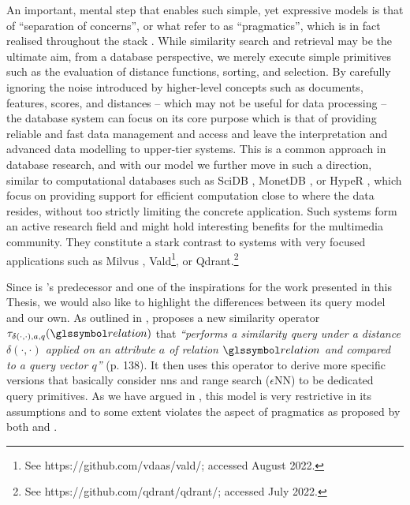 An important, mental step that enables such simple, yet expressive models is that of ``separation of concerns'', or what \cite{Giangreco:2018Database,Ferro:2014Bridging} refer to as ``pragmatics'', which is in fact realised throughout the \vitrivr{} stack \cite{Rossetto:2016Vitrivr,Gasser:2019Multimodal}. While similarity search and retrieval may be the ultimate aim, from a database perspective, we merely execute simple primitives such as the evaluation of distance functions, sorting, and selection. By carefully ignoring the noise introduced by higher-level concepts such as documents, features, scores, and distances -- which may not be useful for data processing -- the database system can focus on its core purpose which is that of providing reliable and fast data management and access and leave the interpretation and advanced data modelling to upper-tier systems. This is a common approach in database research, and with our model we further move in such a direction, similar to computational databases such as SciDB \cite{Stonebraker:2013SciDB}, MonetDB \cite{Idreos:2012MonetDB}, or HypeR \cite{Hubig:2017HyPerInsight}, which focus on providing support for efficient computation close to where the data resides, without too strictly limiting the concrete application. Such systems form an active research field \cite{Luo:2018Scalable,Blacher:2022Machine} and might hold interesting benefits for the multimedia community. They constitute a stark contrast to systems with very focused applications such as Milvus \cite{Wang:2021Milvus}, Vald\footnote{See https://github.com/vdaas/vald/; accessed August 2022.}, or Qdrant.\footnote{See https://github.com/qdrant/qdrant/; accessed July 2022.}

Since \adampro \cite{Giangreco:2016Adam} is \cottontail{}'s predecessor and one of the inspirations for the work presented in this Thesis, we would also like to highlight the differences between its query model and our own. As outlined in , \cite{Giangreco:2018Database} proposes a new similarity operator $\tau_{\delta(\cdot,\cdot),a,q}(\relation)$ that \emph{``performs a similarity query under a distance $\delta(\cdot,\cdot)$ applied on an attribute $a$ of relation $\relation$ and compared to a query vector $q$''} \cite{Giangreco:2018Database} (p. 138). It then uses this operator to derive more specific versions that basically consider \acrshort{nns} and range search ($\epsilon$NN) to be dedicated query primitives. As we have argued in , this model is very restrictive in its assumptions and to some extent violates the aspect of pragmatics as proposed by both \cite{Ferro:2014Bridging} and \cite{Giangreco:2018Database}.


